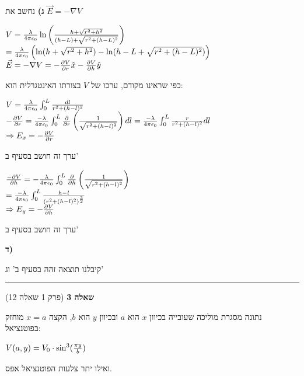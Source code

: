 \documentclass[14pt]{extarticle}
\makeatletter
\newenvironment{lefteqs}{%
    \begin{english}%
    \begin{flushleft}%
    \renewcommand{\arraystretch}{1.3}%
    $\begin{array}{@{}l@{}}%
}{%
    \end{array}$%
    \end{flushleft}%
    \end{english}%
}
\makeatother
\begin{document}
\textbf{ג)} 
נחשב את $\vec{E}=-\nabla V$

\begin{lefteqs}
    V=\frac{\lambda}{4\pi \epsilon_0} \ln{\left( \frac{h+\sqrt{r^2+h^2}}{(h-L) + \sqrt{r^2+(h-L)^2}} \right)}  \\
    = \frac{\lambda}{4\pi \epsilon_0} \left( \ln(h+\sqrt{r^2+h^2}) -\ln(h-L+\sqrt{r^2+(h-L)^2}) \right) \\
    \vec{E} = -\nabla V = -\frac{\partial V}{\partial  r} \hat{x} - \frac{\partial V}{\partial h} \hat{y}
\end{lefteqs}

כפי שראינו מקודם, ערכו של $V$ בצורתו האינטגרלית הוא:

\begin{lefteqs}
    V=\frac{\lambda}{4\pi \epsilon_0} \int_0^L \frac{dl}{r^2+(h-l)^2} \\
    -\frac{\partial V}{\partial r} = \frac{-\lambda}{4\pi \epsilon_0} \int_0^L \frac{\partial}{\partial r} \left( \frac{1}{\sqrt{r^2 + (h-l)^2}} \right) dl =
    \frac{-\lambda}{4\pi \epsilon_0} \int_0^L \frac{r}{r^2 +  (h-l)^2} dl \\
    \Rightarrow E_x = -\frac{\partial V}{\partial r} 
\end{lefteqs}
ערך זה חושב בסעיף ב'

\begin{lefteqs}
    \frac{-\partial V}{\partial h} = -\frac{\lambda}{4\pi \epsilon_0} \int_0^L \frac{\partial}{\partial h} \left( \frac{1}{\sqrt{r^2+(h-l)^2}} \right) \\
    = \frac{-\lambda}{4\pi \epsilon_0} \int_0^L \frac{h-l}{(r^2 + (h-l)^2)^{\frac{3}{2}}} \\
    \Rightarrow E_y = -\frac{\partial V}{\partial h}
\end{lefteqs}
ערך זה חושב בסעיף ב'

\textbf{ד)} 

קיבלנו תוצאה זהה בסעיף ב' וג'

\vspace{3em}
\hrule
\vspace{2em}

\textbf{\large שאלה 3}
(פרק 1 שאלה 12)

נתונה מסגרת מוליכה שעובייה בכיוון $x$ הוא $a$ ובכיוון $y$ הוא $b$, הקצה $x=a$ מוחזק בפוטנציאל:

\begin{lefteqs}
    V(a,y) = V_0 \cdot \sin^3(\frac{\pi y}{b})
\end{lefteqs}
ואילו יתר צלעות הפוטנציאל אפס.
\end{document}
